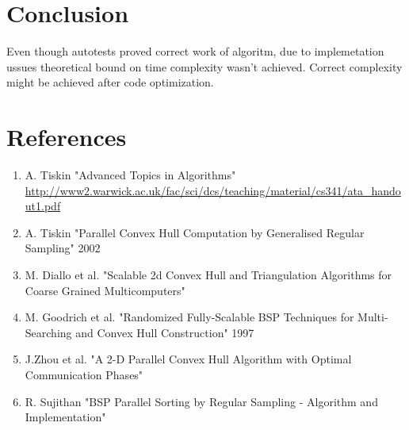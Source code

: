 \documentclass[a4paper]{article}
\begin{document}
\section {Conclusion}
    Even though autotests proved correct work of algoritm,
    due to implemetation ussues theoretical bound on time complexity wasn't 
    achieved. Correct complexity might be achieved after code optimization.



\section {References}
    \begin {enumerate}
        \item A. Tiskin "Advanced Topics in Algorithms" \url{http://www2.warwick.ac.uk/fac/sci/dcs/teaching/material/cs341/ata_handout1.pdf}
        \item A. Tiskin "Parallel Convex Hull Computation by Generalised Regular Sampling" 2002
        \item M. Diallo et al. "Scalable 2d Convex Hull and Triangulation Algorithms for Coarse Grained Multicomputers"
        \item M. Goodrich et al. "Randomized Fully-Scalable BSP Techniques for Multi-Searching and Convex Hull Construction" 1997
        \item J.Zhou et al. "A 2-D Parallel Convex Hull Algorithm with Optimal Communication Phases"
        \item R. Sujithan "BSP Parallel Sorting by Regular Sampling - Algorithm and Implementation"
    \end {enumerate}
\end{document}
